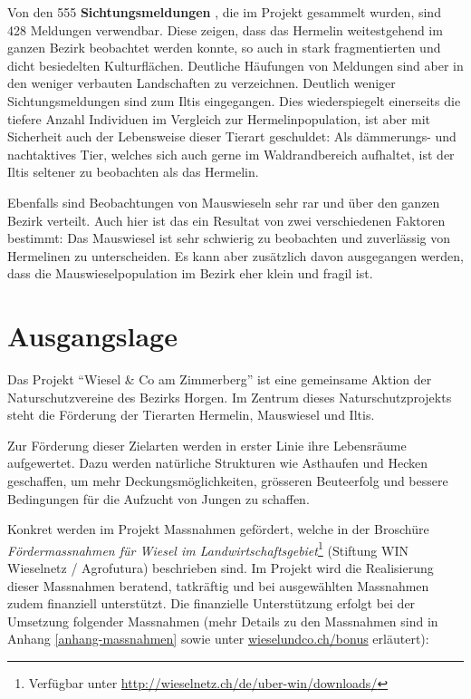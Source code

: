 \documentclass[
]{scrbook}
\begin{document}
Von den 555 \textbf{Sichtungsmeldungen} , die im Projekt gesammelt wurden, sind 428 Meldungen verwendbar. Diese zeigen, dass das Hermelin weitestgehend im ganzen Bezirk beobachtet werden konnte, so auch in stark fragmentierten und dicht besiedelten Kulturflächen. Deutliche Häufungen von Meldungen sind aber in den weniger verbauten Landschaften zu verzeichnen. Deutlich weniger Sichtungsmeldungen sind zum Iltis eingegangen. Dies wiederspiegelt einerseits die tiefere Anzahl Individuen im Vergleich zur Hermelinpopulation, ist aber mit Sicherheit auch der Lebensweise dieser Tierart geschuldet: Als dämmerungs- und nachtaktives Tier, welches sich auch gerne im Waldrandbereich aufhaltet, ist der Iltis seltener zu beobachten als das Hermelin.

Ebenfalls sind Beobachtungen von Mauswieseln sehr rar und über den ganzen Bezirk verteilt. Auch hier ist das ein Resultat von zwei verschiedenen Faktoren bestimmt: Das Mauswiesel ist sehr schwierig zu beobachten und zuverlässig von Hermelinen zu unterscheiden. Es kann aber zusätzlich davon ausgegangen werden, dass die Mauswieselpopulation im Bezirk eher klein und fragil ist.

\hypertarget{ausgangslage}{%
\chapter{Ausgangslage}\label{ausgangslage}}

Das Projekt ``Wiesel \& Co am Zimmerberg'' ist eine gemeinsame Aktion der Naturschutzvereine des Bezirks Horgen. Im Zentrum dieses Naturschutzprojekts steht die Förderung der Tierarten Hermelin, Mauswiesel und Iltis.

Zur Förderung dieser Zielarten werden in erster Linie ihre Lebensräume aufgewertet. Dazu werden natürliche Strukturen wie Asthaufen und Hecken geschaffen, um mehr Deckungsmöglichkeiten, grösseren Beuteerfolg und bessere Bedingungen für die Aufzucht von Jungen zu schaffen.

Konkret werden im Projekt Massnahmen gefördert, welche in der Broschüre \emph{Fördermassnahmen für Wiesel im Landwirtschaftsgebiet}\footnote{Verfügbar unter \url{http://wieselnetz.ch/de/uber-win/downloads/}} (Stiftung WIN Wieselnetz / Agrofutura) beschrieben sind. Im Projekt wird die Realisierung dieser Massnahmen beratend, tatkräftig und bei ausgewählten Massnahmen zudem finanziell unterstützt. Die finanzielle Unterstützung erfolgt bei der Umsetzung folgender Massnahmen (mehr Details zu den Massnahmen sind in Anhang \ref{anhang-massnahmen} sowie unter \href{http://www.wieselundco.ch/bonus}{wieselundco.ch/bonus} erläutert):
\end{document}
